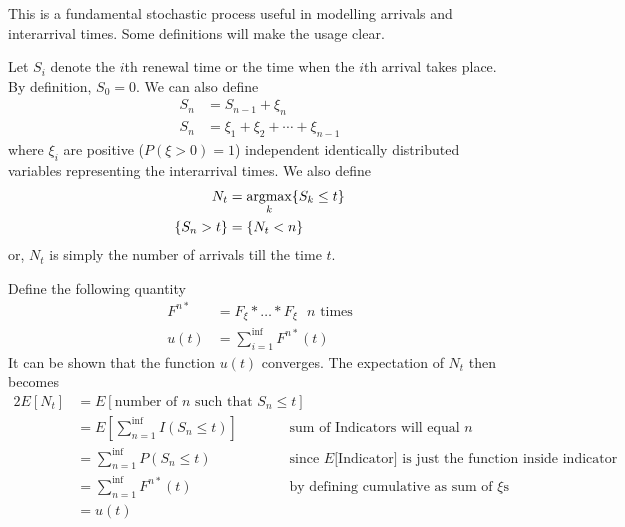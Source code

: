 \documentclass[../probability-notes.tex]{subfiles}
\begin{document}
    This is a fundamental stochastic process useful in modelling arrivals and interarrival times. Some definitions will make the usage clear.\newline

    Let $S_{i}$ denote the $i$th renewal time or the time when the $i$th arrival takes place. By definition, $S_{0} = 0$. We can also define
    \begin{align*}
        S_{n} &= S_{n-1} + \xi_{n}\\
        S_{n} &= \xi_{1} + \xi_{2} + \cdots + \xi_{n-1}
    \end{align*}
    where $\xi_{i}$ are positive ($P(\xi > 0) = 1$) independent identically distributed variables representing the interarrival times. We also define
    \begin{align*}
        N_{t} &= \operatorname*{argmax}_{k} \{ S_{k} \leq t \}\\
        \{ S_{n} > t \} &= \{ N_{t} < n \}
    \end{align*}
    or, $N_{t}$ is simply the number of arrivals till the time $t$.\newline

    Define the following quantity
    \begin{align*}
        F^{n*} &= F_{\xi} * \ldots * F_{\xi} \text{ $n$ times}\\
        u(t) &= \sum_{i=1}^{\inf} F^{n*}(t)
    \end{align*}
    It can be shown that the function $u(t)$ converges. The expectation of $N_{t}$ then becomes
    \begin{alignat*}{2}
        E[N_{t}] &= E[\text{number of $n$ such that $S_{n} \leq t$}]\\
        &= E[\sum_{n=1}^{\inf} I(S_{n} \leq t)] &\text{ sum of Indicators will equal $n$}\\
        &= \sum_{n=1}^{\inf} P(S_{n} \leq t) &\text{ since $E[$Indicator$]$ is just the function inside indicator}\\
        &= \sum_{n=1}^{\inf} F^{n*}(t) &\text{ by defining cumulative as sum of $\xi$s}\\
        &= u(t)
    \end{alignat*}
\end{document}
